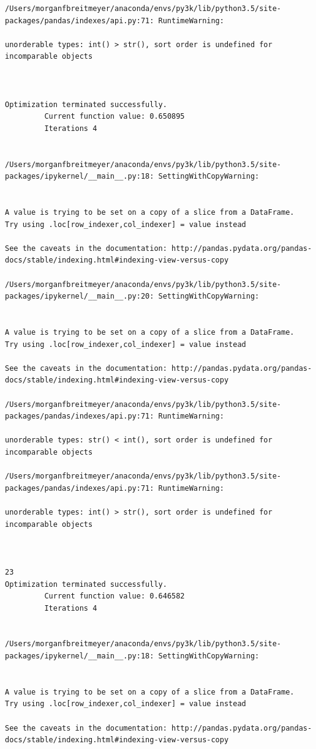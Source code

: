 \begin{lstlisting}
/Users/morganfbreitmeyer/anaconda/envs/py3k/lib/python3.5/site-packages/pandas/indexes/api.py:71: RuntimeWarning:

unorderable types: int() > str(), sort order is undefined for incomparable objects



Optimization terminated successfully.
         Current function value: 0.650895
         Iterations 4


/Users/morganfbreitmeyer/anaconda/envs/py3k/lib/python3.5/site-packages/ipykernel/__main__.py:18: SettingWithCopyWarning:


A value is trying to be set on a copy of a slice from a DataFrame.
Try using .loc[row_indexer,col_indexer] = value instead

See the caveats in the documentation: http://pandas.pydata.org/pandas-docs/stable/indexing.html#indexing-view-versus-copy

/Users/morganfbreitmeyer/anaconda/envs/py3k/lib/python3.5/site-packages/ipykernel/__main__.py:20: SettingWithCopyWarning:


A value is trying to be set on a copy of a slice from a DataFrame.
Try using .loc[row_indexer,col_indexer] = value instead

See the caveats in the documentation: http://pandas.pydata.org/pandas-docs/stable/indexing.html#indexing-view-versus-copy

/Users/morganfbreitmeyer/anaconda/envs/py3k/lib/python3.5/site-packages/pandas/indexes/api.py:71: RuntimeWarning:

unorderable types: str() < int(), sort order is undefined for incomparable objects

/Users/morganfbreitmeyer/anaconda/envs/py3k/lib/python3.5/site-packages/pandas/indexes/api.py:71: RuntimeWarning:

unorderable types: int() > str(), sort order is undefined for incomparable objects



23
Optimization terminated successfully.
         Current function value: 0.646582
         Iterations 4


/Users/morganfbreitmeyer/anaconda/envs/py3k/lib/python3.5/site-packages/ipykernel/__main__.py:18: SettingWithCopyWarning:


A value is trying to be set on a copy of a slice from a DataFrame.
Try using .loc[row_indexer,col_indexer] = value instead

See the caveats in the documentation: http://pandas.pydata.org/pandas-docs/stable/indexing.html#indexing-view-versus-copy


\end{lstlisting}
